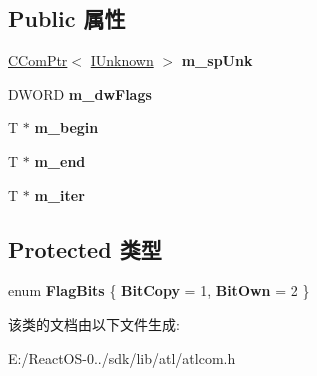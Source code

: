 \subsection*{Public 属性}
\begin{DoxyCompactItemize}
\item 
\mbox{\label{class_a_t_l_1_1_c_com_enum_impl_a3ca997166b645ac95807362447d30c80}} 
\hyperlink{class_a_t_l_1_1_c_com_ptr}{C\+Com\+Ptr}$<$ \hyperlink{interface_i_unknown}{I\+Unknown} $>$ {\bfseries m\+\_\+sp\+Unk}
\item 
\mbox{\label{class_a_t_l_1_1_c_com_enum_impl_a5ed6c730f9e0a1a55c0b32436f449889}} 
D\+W\+O\+RD {\bfseries m\+\_\+dw\+Flags}
\item 
\mbox{\label{class_a_t_l_1_1_c_com_enum_impl_ae033f0a54d41e3202109bec8c57cd162}} 
T $\ast$ {\bfseries m\+\_\+begin}
\item 
\mbox{\label{class_a_t_l_1_1_c_com_enum_impl_a660545e708bd5cd8fd7e41c71fa7e9b2}} 
T $\ast$ {\bfseries m\+\_\+end}
\item 
\mbox{\label{class_a_t_l_1_1_c_com_enum_impl_a8171f38d7455a86e55e7206ca538bea4}} 
T $\ast$ {\bfseries m\+\_\+iter}
\end{DoxyCompactItemize}
\subsection*{Protected 类型}
\begin{DoxyCompactItemize}
\item 
\mbox{\label{class_a_t_l_1_1_c_com_enum_impl_aaa2a2a6ef020beca13f40eafeffa5864}} 
enum {\bfseries Flag\+Bits} \{ {\bfseries Bit\+Copy} = 1, 
{\bfseries Bit\+Own} = 2
 \}
\end{DoxyCompactItemize}


该类的文档由以下文件生成\+:\begin{DoxyCompactItemize}
\item 
E\+:/\+React\+O\+S-\/0../sdk/lib/atl/atlcom.\+h\end{DoxyCompactItemize}

